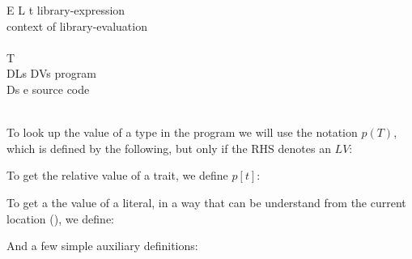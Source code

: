 \begin{bnf}
{E}      {L \mmid{} t \mmid{}  \mmid{} }           {library-expression}\\  {context of library-evaluation}\\           {}\\      { T}                                                 {}\\      {DLs\Q{;} DVs}                                                     {program}\\      {Ds e}                                                             {source code}
\end{bnf}
\\

\noindent To look up the value of a type in the program we will use the notation $p(T)$, which is defined by the following, but only if the RHS denotes an $LV$:
\begin{defye}%
%
%
%
\end{defye}

\noindent To get the relative value of a trait, we define $p[t]$:
\begin{defye}%
%
\end{defye}

\noindent To get a the value of a literal, in a way that can be understand from the current location (), we define:
\begin{defye}%
\end{defye}

\noindent And a few simple auxiliary definitions:
\begin{defye}%
\end{defye}

